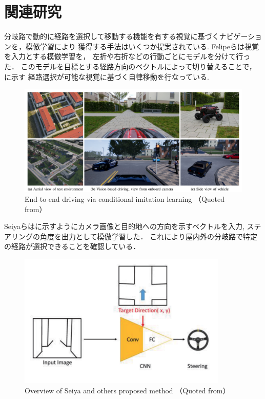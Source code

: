 \clearpage
\section{関連研究}
分岐路で動的に経路を選択して移動する機能を有する視覚に基づくナビゲーションを，模倣学習により
獲得する手法はいくつか提案されている.
Felipeら\cite{codevilla2018endtoend}は視覚を入力とする模倣学習を，
左折や右折などの行動ごとにモデルを分けて行った．
このモデルを目標とする経路方向のベクトルによって切り替えることで，に示す
経路選択が可能な視覚に基づく自律移動を行なっている.
\begin{figure}[htbp]
    \centering
     \includegraphics[width=120mm]{images/pdf/fleipe.pdf}
     \caption{End-to-end driving via conditional imitation learning （Quoted from\cite{codevilla2018endtoend}）}
     \label{fig:felipe}
\end{figure}

Seiyaら\cite{seiya2018}はに示すようにカメラ画像と目的地への方向を示すベクトルを入力,
ステアリングの角度を出力として模倣学習した．
これにより屋内外の分岐路で特定の経路が選択できることを確認している．
\begin{figure}[htbp]
    \centering
     \includegraphics[width=100mm]{images/pdf/seiya.pdf}
     \caption{Overview of Seiya and others proposed method （Quoted from\cite{seiya2018}）}
     \label{fig:seiya}
\end{figure}

